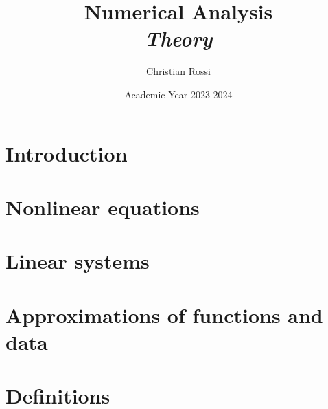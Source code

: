 \documentclass[12pt, a4paper]{report}
\title{Numerical Analysis \\ \textit{Theory}}
\author{Christian Rossi}
\date{Academic Year 2023-2024}
\begin{document}
    \maketitle

    \newpage

    

    \cleardoublepage

    \tableofcontents

    \cleardoublepage

    \chapter{Introduction}
    
    

    \chapter{Nonlinear equations}
    
    
    
    
    
    
    
    
    

    \chapter{Linear systems}
    
    
    

    \chapter{Approximations of functions and data}


    \chapter{Definitions}
    
    
    
\end{document}
